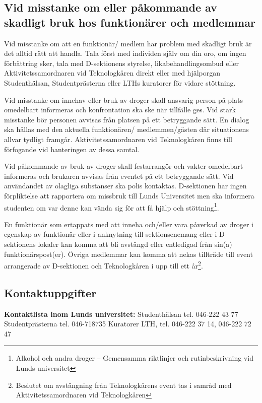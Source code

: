\documentclass[]{dsekkallelse}
\begin{document}
\subsection{Vid misstanke om eller påkommande av skadligt bruk hos funktionärer och medlemmar}

Vid misstanke om att en funktionär/ medlem har problem med skadligt bruk är det alltid rätt att handla. Tala först med individen själv om din oro, om ingen förbättring sker, tala med D-sektionens styrelse, likabehandlingsombud eller Aktivitetssamordnaren vid Teknologkåren direkt eller med hjälporgan Studenthälsan, Studentprästerna eller LTHs kuratorer för vidare stöttning.

Vid misstanke om innehav eller bruk av droger skall ansvarig person på plats omedelbart informeras och konfrontation ska ske när tillfälle ges. Vid stark misstanke bör personen avvisas från platsen på ett betryggande sätt. En dialog ska hållas med den aktuella funktionären/ medlemmen/gästen där situationens allvar tydligt framgår. Aktivitetssamordnaren vid Teknologkåren finns till förfogande vid hanteringen av dessa samtal.

Vid påkommande av bruk av droger skall festarrangör och vakter omedelbart informeras och brukaren avvisas från eventet på ett betryggande sätt. Vid användandet av olagliga substanser ska polis kontaktas. D-sektionen har ingen förpliktelse att rapportera om missbruk till Lunds Universitet men ska informera studenten om var denne kan vända sig för att få hjälp och stöttning\footnote{Alkohol och andra droger – Gemensamma riktlinjer och rutinbeskrivning vid Lunds universitet}.

En funktionär som ertappats med att inneha och/eller vara påverkad av droger i egenskap av funktionär eller i anknytning till sektionsenemang eller i D-sektionens lokaler kan komma att bli avstängd eller entledigad från sin(a) funktionärspost(er). Övriga medlemmar kan komma att nekas tillträde till event arrangerade av D-sektionen och Teknologkåren i upp till ett år\footnote{Beslutet om avstängning från Teknologkårens event  tas i samråd med Aktivitetssamordnaren vid Teknologkåren}.

\subsection{Kontaktuppgifter}
\textbf{Kontaktlista inom Lunds universitet:}\newline
Studenthälsan tel. 046-222 43 77 \newline
Studentprästerna tel. 046-718735\newline
Kuratorer LTH, tel. 046-222 37 14, 046-222 72 47
\end{document}
